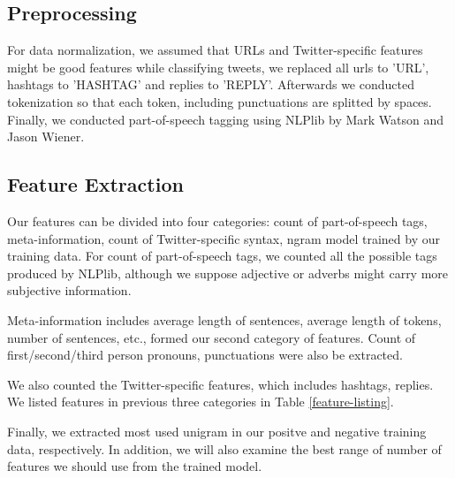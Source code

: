\documentclass[12pt]{article}
\begin{document}
\subsection{Preprocessing}\label{preprocessing}
For data normalization, we assumed that URLs and Twitter-specific features might be good features while classifying tweets, we replaced all urls to 'URL', hashtags to 'HASHTAG' and replies to 'REPLY'. Afterwards we conducted tokenization so that each token, including punctuations are splitted by spaces. Finally, we conducted part-of-speech tagging using NLPlib \cite{NLPlib} by Mark Watson and Jason Wiener.

\subsection{Feature Extraction}\label{feature-extraction}
Our features can be divided into four categories: count of part-of-speech tags, meta-information, count of Twitter-specific syntax, ngram model trained by our training data. For count of part-of-speech tags, we counted all the possible tags produced by NLPlib, although we suppose adjective or adverbs might carry more subjective information.

Meta-information includes average length of sentences, average length of tokens, number of sentences, etc., formed our second category of features. Count of first/second/third person pronouns, punctuations were also be extracted.

We also counted the Twitter-specific features, which includes hashtags, replies. We listed features in previous three categories in Table \ref{feature-listing}.

Finally, we extracted most used unigram in our positve and negative training data, respectively. In addition, we will also examine the best range of number of features we should use from the trained model.
\end{document}
